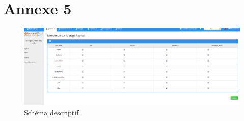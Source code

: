 \section{Annexe 5}
\begin{figure}[!h]
\begin{center}
\includegraphics[width=15cm]{image/page-rights.png}
\end{center}
\caption{Schéma descriptif}
\end{figure}